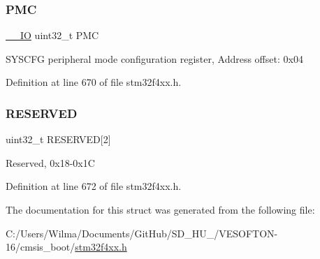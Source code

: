 \mbox{\label{struct_s_y_s_c_f_g___type_def_a2130abf1fefb63ce4c4b138fd8c9822a}} 
\subsubsection{\texorpdfstring{P\+MC}{PMC}}
{\footnotesize\ttfamily \hyperlink{group___c_m_s_i_s__core__definitions_gaec43007d9998a0a0e01faede4133d6be}{\+\_\+\+\_\+\+IO} uint32\+\_\+t P\+MC}

S\+Y\+S\+C\+FG peripheral mode configuration register, Address offset\+: 0x04 

Definition at line 670 of file stm32f4xx.\+h.

\mbox{\label{struct_s_y_s_c_f_g___type_def_afaf27b66c1edc60064db3fa6e693fb59}} 
\subsubsection{\texorpdfstring{R\+E\+S\+E\+R\+V\+ED}{RESERVED}}
{\footnotesize\ttfamily uint32\+\_\+t R\+E\+S\+E\+R\+V\+ED\mbox{[}2\mbox{]}}

Reserved, 0x18-\/0x1C 

Definition at line 672 of file stm32f4xx.\+h.



The documentation for this struct was generated from the following file\+:\begin{DoxyCompactItemize}
\item 
C\+:/\+Users/\+Wilma/\+Documents/\+Git\+Hub/\+S\+D\+\_\+\+H\+U\+\_/\+V\+E\+S\+O\+F\+T\+O\+N-\/16/cmsis\+\_\+boot/\hyperlink{stm32f4xx_8h}{stm32f4xx.\+h}\end{DoxyCompactItemize}
